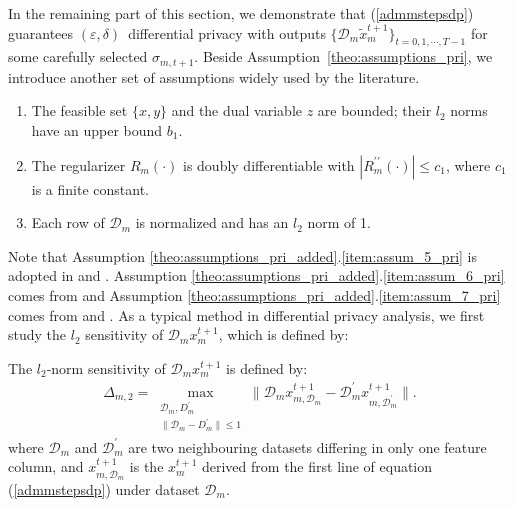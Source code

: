 In the remaining part of this section, we demonstrate that (\ref{admmstepsdp}) guarantees $(\varepsilon, \delta)$~differential privacy with outputs $\{\mathcal{D}_m\tilde{x}_m^{t+1}\}_{t=0,1,\cdots,T-1}$ for some carefully selected $\sigma_{m,t+1}$. Beside Assumption~\ref{theo:assumptions_pri}, we introduce another set of assumptions widely used by the literature.
\begin{assume}\label{theo:assumptions_pri_added}
  \begin{enumerate}
    \item The feasible set $\{x,y\}$ and the dual variable $z$ are bounded; their $l_2$ norms have an upper bound $b_1$.\label{item:assum_5_pri}
    \item The regularizer $R_m(\cdot)$ is doubly differentiable
    with $|R_m^{\prime\prime}(\cdot)|\leq c_1$, where $c_1$ is a finite constant.\label{item:assum_6_pri}
    \item Each row of $\mathcal{D}_m$ is normalized and has an $l_2$ norm of 1.\label{item:assum_7_pri}
  \end{enumerate}
\end{assume}
Note that Assumption \ref{theo:assumptions_pri_added}.\ref{item:assum_5_pri} is adopted in \cite{sarwate2013signal} and \cite{wang2019global}. Assumption \ref{theo:assumptions_pri_added}.\ref{item:assum_6_pri} comes from \cite{zhang2016dynamic} and Assumption \ref{theo:assumptions_pri_added}.\ref{item:assum_7_pri} comes from \cite{zhang2016dynamic}
and \cite{sarwate2013signal}. As a typical method in differential privacy analysis, we first study the $l_2$ sensitivity of
$\mathcal{D}_mx_m^{t+1}$, which is defined by:
\begin{defi}
The $l_2$-norm sensitivity of $\mathcal{D}_mx_m^{t+1}$ is defined by:
  \begin{eqnarray*}
\Delta_{m,2}=\max_{\substack{\mathcal{D}_m,D_m^{\prime}\\
\|\mathcal{D}_m-D_m^{\prime}\|\leq1
}}\|\mathcal{D}_mx_{m,\mathcal{D}_m}^{t+1}
-\mathcal{D}_m^{\prime}x_{m,\mathcal{D}_m^{\prime}}^{t+1}\|.
  \end{eqnarray*}
  where $\mathcal{D}_m$ and $\mathcal{D}_m^{\prime}$ are two neighbouring datasets differing in 
  only one feature column, and 
  $x_{m,\mathcal{D}_m}^{t+1}$ is the $x_m^{t+1}$ derived from the first line of equation 
  (\ref{admmstepsdp}) under dataset $\mathcal{D}_m$.
\end{defi}
